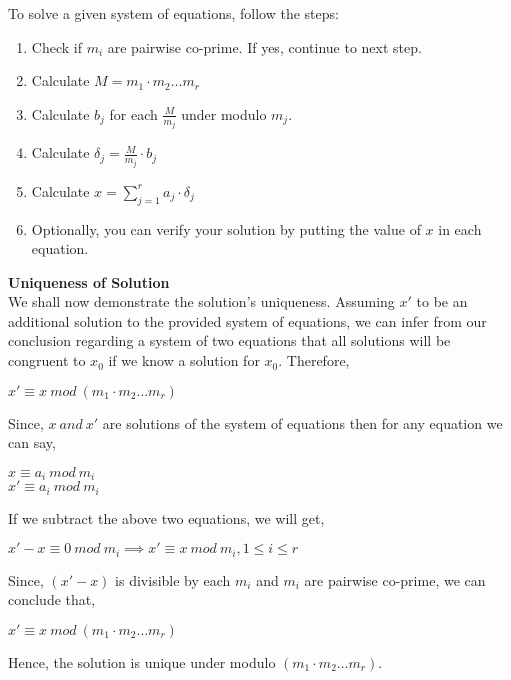\documentclass[11pt]{article}
\begin{document}
To solve a given system of equations, follow the steps:
\begin{enumerate}
    \item Check if $m_i$ are pairwise co-prime. If yes, continue to next step.
    \item Calculate $M = m_1 \cdot m_2 \hdots m_r$
    \item Calculate $b_j$ for each $\frac{M}{m_j}$ under modulo $m_j$.
    \item Calculate $\delta_j = \frac{M}{m_j} \cdot b_j$
    \item Calculate $x = \sum_{j=1}^r a_j \cdot \delta_j$
    \item Optionally, you can verify your solution by putting the value of $x$ in each equation.
\end{enumerate}
\textbf{Uniqueness of Solution}\\
We shall now demonstrate the solution's uniqueness. Assuming $x'$ to be an additional solution to the provided system of equations, we can infer from our conclusion regarding a system of two equations that all solutions will be congruent to $x_0$ if we know a solution for $x_0$. Therefore, 
\begin{center}
    $x' \equiv x \ mod \ (m_1 \cdot m_2 \hdots m_r)$
\end{center}
Since, $x \ and \ x'$ are solutions of the system of equations then for any equation we can say,
\begin{center}
    $x \equiv a_i \ mod \ m_i$\\
    $x' \equiv a_i \ mod \ m_i$
\end{center}
If we subtract the above two equations, we will get,
\begin{center}
    $x' - x \equiv 0 \ mod \ m_i \implies x' \equiv x \ mod \ m_i, 1 \leq i \leq r$
\end{center}
Since, $(x' - x)$ is divisible by each $m_i$ and $m_i$ are pairwise co-prime, we can conclude that,
\begin{center}
    $x' \equiv x \ mod \ (m_1 \cdot m_2 \hdots m_r)$
\end{center}
Hence, the solution is unique under modulo $(m_1 \cdot m_2 \hdots m_r)$.
\end{document}
